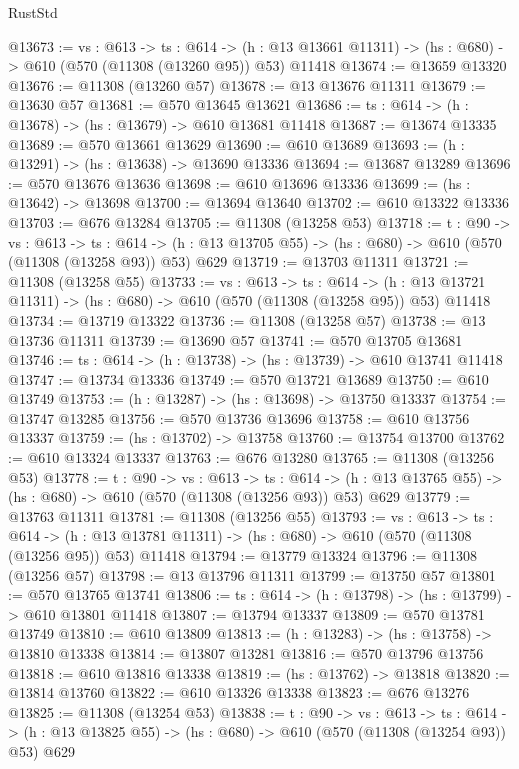 \begin{lexlean}{RustStd}
\begin{coremodule}
@13673 := {vs : @613} ->
  {ts : @614} ->
  (h : @13 @13661 @11311) -> (hs : @680) -> @610 (@570 (@11308 (@13260 @95)) @53) @11418
@13674 := @13659 @13320
@13676 := @11308 (@13260 @57)
@13678 := @13 @13676 @11311
@13679 := @13630 @57
@13681 := @570 @13645 @13621
@13686 := {ts : @614} -> (h : @13678) -> (hs : @13679) -> @610 @13681 @11418
@13687 := @13674 @13335
@13689 := @570 @13661 @13629
@13690 := @610 @13689
@13693 := (h : @13291) -> (hs : @13638) -> @13690 @13336
@13694 := @13687 @13289
@13696 := @570 @13676 @13636
@13698 := @610 @13696 @13336
@13699 := (hs : @13642) -> @13698
@13700 := @13694 @13640
@13702 := @610 @13322 @13336
@13703 := @676 @13284
@13705 := @11308 (@13258 @53)
@13718 := {t : @90} ->
  {vs : @613} ->
  {ts : @614} -> (h : @13 @13705 @55) -> (hs : @680) -> @610 (@570 (@11308 (@13258 @93)) @53) @629
@13719 := @13703 @11311
@13721 := @11308 (@13258 @55)
@13733 := {vs : @613} ->
  {ts : @614} ->
  (h : @13 @13721 @11311) -> (hs : @680) -> @610 (@570 (@11308 (@13258 @95)) @53) @11418
@13734 := @13719 @13322
@13736 := @11308 (@13258 @57)
@13738 := @13 @13736 @11311
@13739 := @13690 @57
@13741 := @570 @13705 @13681
@13746 := {ts : @614} -> (h : @13738) -> (hs : @13739) -> @610 @13741 @11418
@13747 := @13734 @13336
@13749 := @570 @13721 @13689
@13750 := @610 @13749
@13753 := (h : @13287) -> (hs : @13698) -> @13750 @13337
@13754 := @13747 @13285
@13756 := @570 @13736 @13696
@13758 := @610 @13756 @13337
@13759 := (hs : @13702) -> @13758
@13760 := @13754 @13700
@13762 := @610 @13324 @13337
@13763 := @676 @13280
@13765 := @11308 (@13256 @53)
@13778 := {t : @90} ->
  {vs : @613} ->
  {ts : @614} -> (h : @13 @13765 @55) -> (hs : @680) -> @610 (@570 (@11308 (@13256 @93)) @53) @629
@13779 := @13763 @11311
@13781 := @11308 (@13256 @55)
@13793 := {vs : @613} ->
  {ts : @614} ->
  (h : @13 @13781 @11311) -> (hs : @680) -> @610 (@570 (@11308 (@13256 @95)) @53) @11418
@13794 := @13779 @13324
@13796 := @11308 (@13256 @57)
@13798 := @13 @13796 @11311
@13799 := @13750 @57
@13801 := @570 @13765 @13741
@13806 := {ts : @614} -> (h : @13798) -> (hs : @13799) -> @610 @13801 @11418
@13807 := @13794 @13337
@13809 := @570 @13781 @13749
@13810 := @610 @13809
@13813 := (h : @13283) -> (hs : @13758) -> @13810 @13338
@13814 := @13807 @13281
@13816 := @570 @13796 @13756
@13818 := @610 @13816 @13338
@13819 := (hs : @13762) -> @13818
@13820 := @13814 @13760
@13822 := @610 @13326 @13338
@13823 := @676 @13276
@13825 := @11308 (@13254 @53)
@13838 := {t : @90} ->
  {vs : @613} ->
  {ts : @614} -> (h : @13 @13825 @55) -> (hs : @680) -> @610 (@570 (@11308 (@13254 @93)) @53) @629

\end{coremodule}
\end{lexlean}
